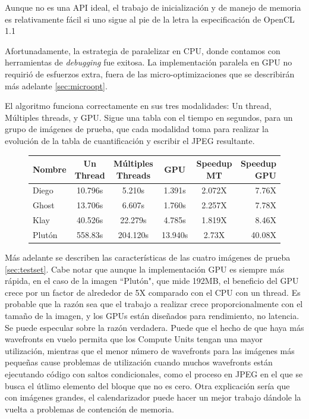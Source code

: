 Aunque no es una API ideal, el trabajo de inicialización y de manejo de memoria
es relativamente fácil si uno sigue al pie de la letra la especificación de
OpenCL 1.1 \cite{opencl-spec}

Afortunadamente, la estrategia de paralelizar en CPU, donde contamos con
herramientas de \emph{debugging} fue exitosa. La implementación paralela en GPU
no requirió de esfuerzos extra, fuera de las micro-optimizaciones que se
describirán más adelante \ref{sec:microopt}.

El algoritmo funciona correctamente en sus tres modalidades: Un thread,
Múltiples threads, y GPU. Sigue una tabla con el tiempo en segundos, para un
grupo de imágenes de prueba, que cada modalidad toma para realizar la evolución
de la tabla de cuantificación y escribir el JPEG resultante.

\begin{figure}[h]
    \begin{tabular}{ |l c c c c r| }
        \hline
        Nombre &  Un Thread & Múltiples Threads & GPU & Speedup MT & Speedup GPU \\
        \hline
        Diego & 10.796s & 5.210s & 1.391s  & 2.072X & 7.76X \\
        Ghost & 13.706s & 6.607s & 1.760s  & 2.257X & 7.78X \\
        Klay & 40.526s & 22.279s & 4.785s  & 1.819X & 8.46X \\%
        Plutón & 558.83s & 204.120s & 13.940s & 2.73X & 40.08X \\ %
        \hline
    \end{tabular}
\end{figure}

Más adelante se describen las características de las cuatro imágenes de prueba
\ref{sec:testset}. Cabe notar que aunque la implementación GPU es siempre más
rápida, en el caso de la imagen ``Plutón", que mide 192MB, el beneficio del GPU
crece por un factor de alrededor de 5X comparado con el CPU con un thread. Es
probable que la razón sea que el trabajo a realizar crece proporcionalmente con
el tamaño de la imagen, y los GPUs están diseñados para rendimiento, no
latencia. Se puede especular sobre la razón verdadera. Puede que el hecho de
que haya más wavefronts en vuelo permita que los Compute Units tengan una mayor
utilización, mientras que el menor número de wavefronts para las imágenes más
pequeñas cause problemas de utilización cuando muchos wavefronts están
ejecutando código con saltos condicionales, como el proceso en JPEG en el que
se busca el útlimo elemento del bloque que no es cero. Otra explicación sería
que con imágenes grandes, el calendarizador puede hacer un mejor trabajo
dándole la vuelta a problemas de contención de memoria.

